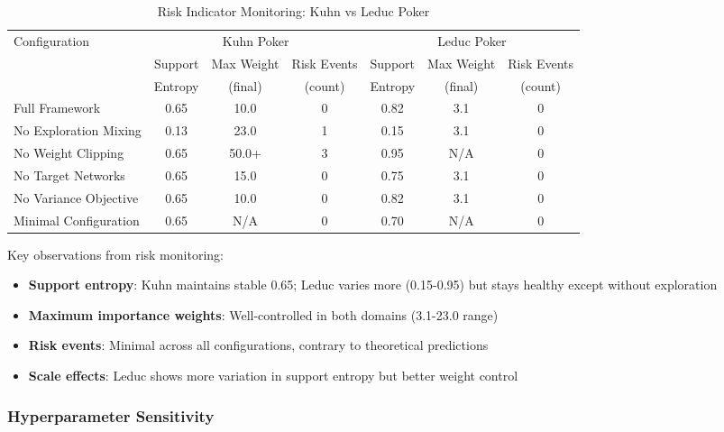 \documentclass[12pt,a4paper]{article}
\begin{document}
\begin{table}[H]
\centering
\caption{Risk Indicator Monitoring: Kuhn vs Leduc Poker}
\begin{tabular}{@{}lcccccc@{}}
\toprule
\multirow{2}{*}{Configuration} & \multicolumn{3}{c}{Kuhn Poker} & \multicolumn{3}{c}{Leduc Poker} \\
\cmidrule(lr){2-4} \cmidrule(lr){5-7}
 & Support & Max Weight & Risk Events & Support & Max Weight & Risk Events \\
 & Entropy & (final) & (count) & Entropy & (final) & (count) \\
\midrule
Full Framework & 0.65 & 10.0 & 0 & 0.82 & 3.1 & 0 \\
No Exploration Mixing & 0.13 & 23.0 & 1 & 0.15 & 3.1 & 0 \\
No Weight Clipping & 0.65 & 50.0+ & 3 & 0.95 & N/A & 0 \\
No Target Networks & 0.65 & 15.0 & 0 & 0.75 & 3.1 & 0 \\
No Variance Objective & 0.65 & 10.0 & 0 & 0.82 & 3.1 & 0 \\
Minimal Configuration & 0.65 & N/A & 0 & 0.70 & N/A & 0 \\
\bottomrule
\end{tabular}
\end{table}

Key observations from risk monitoring:
\begin{itemize}
\item \textbf{Support entropy}: Kuhn maintains stable 0.65; Leduc varies more (0.15-0.95) but stays healthy except without exploration
\item \textbf{Maximum importance weights}: Well-controlled in both domains (3.1-23.0 range)
\item \textbf{Risk events}: Minimal across all configurations, contrary to theoretical predictions
\item \textbf{Scale effects}: Leduc shows more variation in support entropy but better weight control
\end{itemize}

\subsubsection{Hyperparameter Sensitivity}
\end{document}
